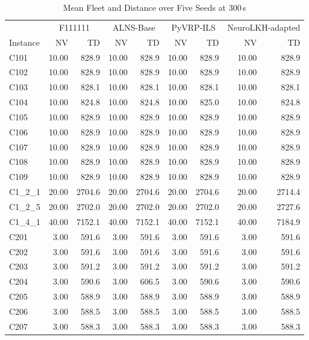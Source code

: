 \documentclass{article}
\begin{document}
{\footnotesize
\begin{longtable}{l r r r r r r r r }
\caption{Mean Fleet and Distance over Five Seeds at 300\,s} \\
\toprule
& \multicolumn{2}{c}{F111111} & \multicolumn{2}{c}{ALNS-Base} & \multicolumn{2}{c}{PyVRP-ILS} & \multicolumn{2}{c}{NeuroLKH-adapted} \\
Instance & NV & TD & NV & TD & NV & TD & NV & TD \\
\midrule
\endhead
C101 & 10.00 & 828.9 & 10.00 & 828.9 & 10.00 & 828.9 & 10.00 & 828.9 \\
C102 & 10.00 & 828.9 & 10.00 & 828.9 & 10.00 & 828.9 & 10.00 & 828.9 \\
C103 & 10.00 & 828.1 & 10.00 & 828.1 & 10.00 & 828.1 & 10.00 & 828.1 \\
C104 & 10.00 & 824.8 & 10.00 & 824.8 & 10.00 & 825.0 & 10.00 & 824.8 \\
C105 & 10.00 & 828.9 & 10.00 & 828.9 & 10.00 & 828.9 & 10.00 & 828.9 \\
C106 & 10.00 & 828.9 & 10.00 & 828.9 & 10.00 & 828.9 & 10.00 & 828.9 \\
C107 & 10.00 & 828.9 & 10.00 & 828.9 & 10.00 & 828.9 & 10.00 & 828.9 \\
C108 & 10.00 & 828.9 & 10.00 & 828.9 & 10.00 & 828.9 & 10.00 & 828.9 \\
C109 & 10.00 & 828.9 & 10.00 & 828.9 & 10.00 & 828.9 & 10.00 & 828.9 \\
C1\_2\_1 & 20.00 & 2704.6 & 20.00 & 2704.6 & 20.00 & 2704.6 & 20.00 & 2714.4 \\
C1\_2\_5 & 20.00 & 2702.0 & 20.00 & 2702.0 & 20.00 & 2702.0 & 20.00 & 2727.6 \\
C1\_4\_1 & 40.00 & 7152.1 & 40.00 & 7152.1 & 40.00 & 7152.1 & 40.00 & 7184.9 \\
C201 & 3.00 & 591.6 & 3.00 & 591.6 & 3.00 & 591.6 & 3.00 & 591.6 \\
C202 & 3.00 & 591.6 & 3.00 & 591.6 & 3.00 & 591.6 & 3.00 & 591.6 \\
C203 & 3.00 & 591.2 & 3.00 & 591.2 & 3.00 & 591.2 & 3.00 & 591.2 \\
C204 & 3.00 & 590.6 & 3.00 & 606.5 & 3.00 & 590.6 & 3.00 & 590.6 \\
C205 & 3.00 & 588.9 & 3.00 & 588.9 & 3.00 & 588.9 & 3.00 & 588.9 \\
C206 & 3.00 & 588.5 & 3.00 & 588.5 & 3.00 & 588.5 & 3.00 & 588.5 \\
C207 & 3.00 & 588.3 & 3.00 & 588.3 & 3.00 & 588.3 & 3.00 & 588.3 \\

\end{longtable}}
\end{document}
